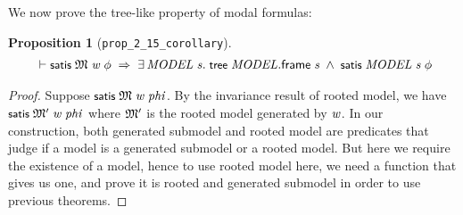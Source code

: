 \documentclass[letterpaper]{article}
\newtheorem{prop}{Proposition}
\renewcommand{\HOLConst}[1]{{\textsf{\upshape\small #1}}}
\renewcommand{\HOLinline}[1]{\ensuremath{#1}}
\newenvironment{holmath}{\begin{displaymath}\begin{array}{l}}{\end{array}\end{displaymath}\ignorespacesafterend}
\begin{document}
We now prove the tree-like property of modal formulas:
\begin{prop}[\texttt{prop_2_15_corollary}]
\begin{holmath}
  \ensuremath{\HOLTokenTurnstile}\HOLConst{satis}\;\HOLFreeVar{\ensuremath{\mathfrak{M}}}\;\HOLFreeVar{w}\;\HOLFreeVar{\ensuremath{\phi}}\;\HOLSymConst{\HOLTokenImp{}}\;\HOLSymConst{\HOLTokenExists{}}\HOLBoundVar{MODEL}\;\HOLBoundVar{s}.\;\HOLConst{tree}\;\HOLBoundVar{MODEL}.\HOLFieldName{frame}\;\HOLBoundVar{s}\;\HOLSymConst{\HOLTokenConj{}}\;\HOLConst{satis}\;\HOLBoundVar{MODEL}\;\HOLBoundVar{s}\;\HOLFreeVar{\ensuremath{\phi}}
\end{holmath}
\end{prop}
\begin{proof}
  Suppose \HOLinline{\HOLConst{satis}\;\HOLFreeVar{\ensuremath{\mathfrak{M}}}\;\HOLFreeVar{w}\;\HOLFreeVar{phi}}. By the invariance result of rooted model, we have \HOLinline{\HOLConst{satis}\;\HOLFreeVar{\ensuremath{\mathfrak{M}'}}\;\HOLFreeVar{w}\;\HOLFreeVar{phi}} where \HOLinline{\HOLFreeVar{\ensuremath{\mathfrak{M}'}}} is the rooted model generated by \HOLinline{\HOLFreeVar{w}}. In our construction, both generated submodel and rooted model are predicates that judge if a model is a generated submodel or a rooted model. But here we require the existence of a model, hence to use rooted model here, we need a function that gives us one, and prove it is rooted and generated submodel in order to use previous theorems.


\end{proof}
\end{document}
